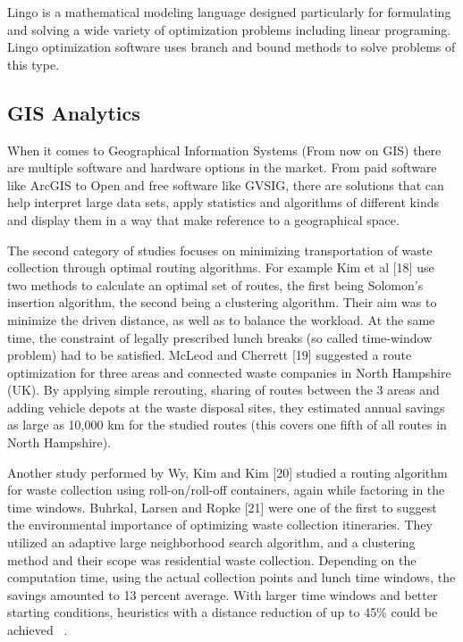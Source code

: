 \documentclass[sigconf]{acmart}
\begin{document}
Lingo is a mathematical modeling language designed particularly for formulating and solving a wide variety of optimization problems including linear programing. Lingo optimization software uses branch and bound methods to solve problems of this type. ~\cite{akbarpour2016}

\subsection{GIS Analytics}

When it comes to Geographical Information Systems (From now on GIS) there are multiple software and hardware options in the market. From paid software like ArcGIS to Open and free software like GVSIG, there are solutions that can help interpret large data sets, apply statistics and algorithms of different kinds and display them in a way that make reference to a geographical space. %

The second category of studies focuses on minimizing transportation of waste collection through optimal routing algorithms. For example Kim et al [18] use two methods to calculate an optimal set of routes, the first being Solomon's insertion algorithm, the second being a clustering algorithm. Their aim was to minimize the driven distance, as well as to balance the workload. At the same time, the constraint of legally prescribed lunch breaks (so called time-window problem) had to be satisfied. McLeod and Cherrett [19] suggested a route optimization for three areas and connected waste companies in North Hampshire (UK). By applying simple rerouting, sharing of routes between the 3 areas and adding vehicle depots at the waste disposal sites, they estimated annual savings as large as 10,000 km for the studied routes (this covers one fifth of all routes in North Hampshire). 

Another study performed by Wy, Kim and Kim [20] studied a routing algorithm for waste collection using roll-on/roll-off containers, again while factoring in the time windows. Buhrkal, Larsen and Ropke [21] were one of the ﬁrst to suggest the environmental importance of optimizing waste collection itineraries. They utilized an adaptive large neighborhood search algorithm, and a clustering method and their scope was residential waste collection. Depending on the computation time, using the actual collection points and lunch time windows, the savings amounted to 13 percent average. With larger time windows and better starting conditions, heuristics with a distance reduction of up to 45\% could be achieved ~\cite{shahrokni2014big}.
\end{document}
